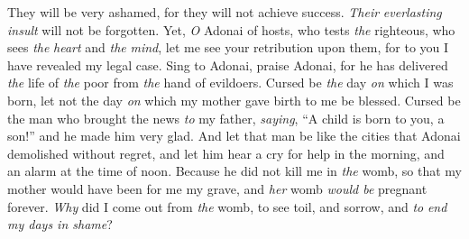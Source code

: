 \begin{biblechapter}
They will be very ashamed, for they will not achieve success. 
\textit{Their} \textit{everlasting insult} will not be forgotten.
\verse Yet, \textit{O} Adonai of hosts, who tests \textit{the} righteous, 
who sees \textit{the} \textit{heart} and \textit{the} \textit{mind}, 
let me see your retribution upon them, 
for to you I have revealed my legal case.
\verse Sing to Adonai, praise Adonai, 
for he has delivered \textit{the} life of \textit{the} poor from \textit{the} hand of evildoers.
\verse Cursed be \textit{the} day \textit{on} which I was born, 
let not the day \textit{on} which my mother gave birth to me be blessed.
\verse Cursed be the man who brought the news \textit{to} my father, 
\textit{saying}, “A child is born to you, a son!” 
and he made him very glad.
\verse And let that man be like the cities 
that Adonai demolished without regret, 
and let him hear a cry for help in the morning, 
and an alarm at the time of noon.
\verse Because he did not kill me in \textit{the} womb, 
so that my mother would have been for me my grave, 
and \textit{her} womb \textit{would be} pregnant forever.
\verse \textit{Why} did I come out from \textit{the} womb, 
to see toil, and sorrow, and \textit{to} \textit{end my days in shame}?
\end{biblechapter}

